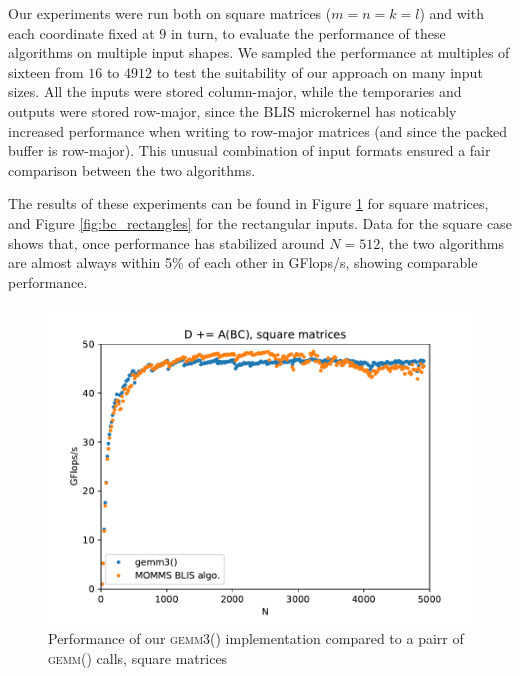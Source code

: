 \documentclass[12pt]{article}
\newcommand*{\gemmt}{{\textsc{gemm3()}}}
\newcommand*{\gemm}{{\textsc{gemm()}}}
\begin{document}
Our experiments were run both on square matrices ($m = n = k = l$) and with each coordinate fixed at $9$ in turn, to evaluate the performance of these algorithms on multiple input shapes.
We sampled the performance at multiples of sixteen from $16$ to $4912$ to test the suitability of our approach on many input sizes.
All the inputs were stored column-major, while the temporaries and outputs were stored row-major, since the BLIS microkernel has noticably increased performance when writing to row-major matrices (and since the packed buffer is row-major).
This unusual combination of input formats ensured a fair comparison between the two algorithms.

The results of these experiments can be found in Figure \ref{fig:bc_square} for square matrices, and Figure \ref{fig:bc_rectangles} for the rectangular inputs.
Data for the square case shows that, once performance has stabilized around $N = 512$, the two algorithms are almost always within 5\% of each other in GFlops/s, showing comparable performance.
\begin{figure}
  \centering
  \includegraphics[height=0.45\textheight]{../results/earwig2/gemm3}
  \caption{Performance of our \gemmt{} implementation compared to a pairr of \gemm{} calls, square matrices}
  \label{fig:bc_square}
\end{figure}
\end{document}
